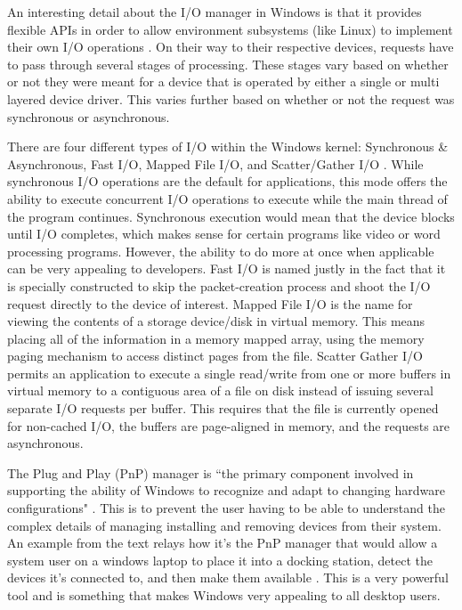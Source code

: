 \par An interesting detail about the I/O manager in Windows is that it provides flexible APIs in order to allow environment subsystems (like Linux) to implement their own I/O operations \cite{win:2}.
On their way to their respective devices, requests have to pass through several stages of processing.
These stages vary based on whether or not they were meant for a device that is operated by either a single or multi layered device driver.
This varies further based on whether or not the request was synchronous or asynchronous.

\par There are four different types of I/O within the Windows kernel: Synchronous \& Asynchronous, Fast I/O, Mapped File I/O, and Scatter/Gather I/O \cite{win:2}.
While synchronous I/O operations are the default for applications, this mode offers the ability to execute concurrent I/O operations to execute while the main thread of the program continues.
Synchronous execution would mean that the device blocks until I/O completes, which makes sense for certain programs like video or word processing programs.
However, the ability to do more at once when applicable can be very appealing to developers.
Fast I/O is named justly in the fact that it is specially constructed to skip the packet-creation process and shoot the I/O request directly to the device of interest.
Mapped File I/O is the name for viewing the contents of a storage device/disk in virtual memory.
This means placing all of the information in a memory mapped array, using the memory paging mechanism to access distinct pages from the file.
Scatter Gather I/O permits an application to execute a single read/write from one or more buffers in virtual memory to a contiguous area of a file on disk instead of issuing several separate I/O requests per buffer.
This requires that the file is currently opened for non-cached I/O, the buffers are page-aligned in memory, and the requests are asynchronous.

\par The Plug and Play (PnP) manager is ``the primary component involved in supporting the ability of Windows to recognize and adapt to changing hardware configurations" \cite{win:2}.
This is to prevent the user having to be able to understand the complex details of managing installing and removing devices from their system.
An example from the text relays how it's the PnP manager that would allow a system user on a windows laptop to place it into a docking station, detect the devices it's connected to, and then make them available \cite{win:2}.
This is a very powerful tool and is something that makes Windows very appealing to all desktop users.


